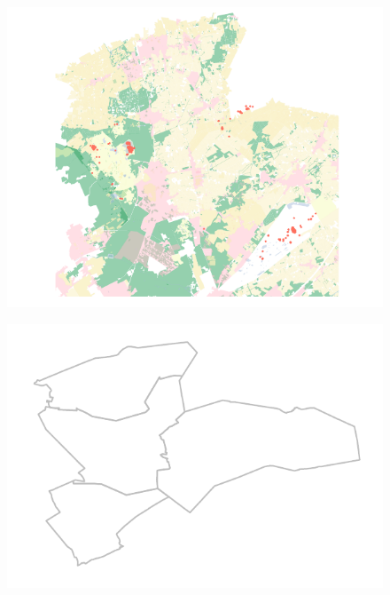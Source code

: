 \documentclass[11pt]{book}
\begin{document}
\begin{multicols}{2}
  
\lipsum[1]


 \begin{figure}[H]
  \includegraphics{Waarnemingen/Bosruiter.pdf}
  \end{figure}

 \begin{figure}[H]
  \includegraphics{Atlas/Bosruiter.pdf}
  \end{figure}
  
\lipsum[1]

\end{multicols}
\end{document}
